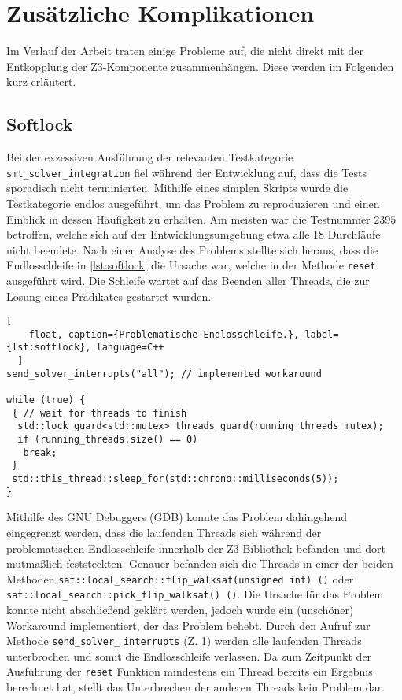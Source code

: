 
\section{Zusätzliche Komplikationen}

Im Verlauf der Arbeit traten einige Probleme auf, die nicht direkt mit der Entkopplung der Z3-Komponente zusammenhängen. Diese werden im Folgenden kurz erläutert.

\subsection{Softlock}
\label{subsec:softlock}

Bei der exzessiven Ausführung der relevanten Testkategorie \texttt{smt\_solver\_integration} fiel während der Entwicklung auf,
dass die Tests sporadisch nicht terminierten.
Mithilfe eines simplen Skripts wurde die Testkategorie endlos ausgeführt, um das Problem zu reproduzieren und einen Einblick in dessen Häufigkeit zu erhalten.
Am meisten war die Testnummer $2395$ betroffen, welche sich auf der Entwicklungsumgebung etwa alle $18$ Durchläufe nicht beendete.
Nach einer Analyse des Problems stellte sich heraus, dass die Endlosschleife in \cref{lst:softlock} die Ursache war, welche in der Methode \texttt{reset} ausgeführt wird.
Die Schleife wartet auf das Beenden aller Threads, die zur Lösung eines Prädikates gestartet wurden.

\begin{lstlisting}[
    float, caption={Problematische Endlosschleife.}, label={lst:softlock}, language=C++
  ]
send_solver_interrupts("all"); // implemented workaround

while (true) {
 { // wait for threads to finish
  std::lock_guard<std::mutex> threads_guard(running_threads_mutex);
  if (running_threads.size() == 0)
   break;
 }
 std::this_thread::sleep_for(std::chrono::milliseconds(5));
}
\end{lstlisting}

Mithilfe des GNU Debuggers (GDB) \cite{stallman1988debugging} konnte das Problem dahingehend eingegrenzt werden,
dass die laufenden Threads sich während der problematischen Endlosschleife innerhalb der Z3-Bibliothek befanden
und dort mutmaßlich feststeckten.
Genauer befanden sich die Threads in einer der beiden Methoden \texttt{sat::local\_search::flip\_walksat(unsigned int) ()} oder \texttt{sat::local\_search::pick\_flip\_walksat() ()}.
Die Ursache für das Problem konnte nicht abschließend geklärt werden, jedoch wurde ein (unschöner) Workaround implementiert, der das Problem behebt.
Durch den Aufruf zur Methode \texttt{send\_solver\_} \texttt{interrupts} (Z. 1) werden alle laufenden Threads unterbrochen und somit die Endlosschleife verlassen.
Da zum Zeitpunkt der Ausführung der \texttt{reset} Funktion mindestens ein Thread bereits ein Ergebnis berechnet hat, stellt das Unterbrechen der anderen Threads kein Problem dar.

